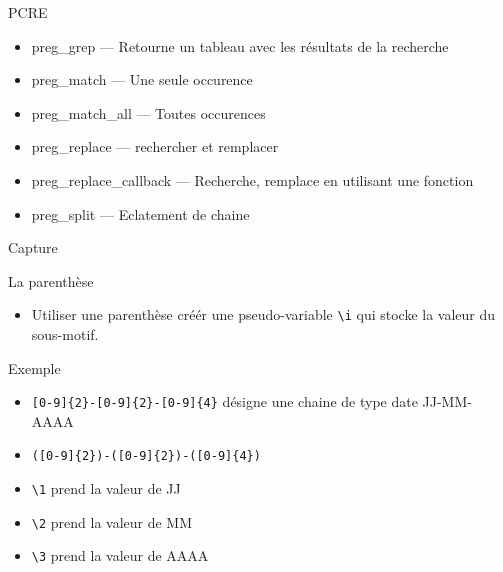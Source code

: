 \begin{frame}[containsverbatim]{\ftitle}
\def\blocktitle{PCRE}
\begin{block}{\blocktitle}
\begin{itemize}
\item preg\_grep — Retourne un tableau avec les résultats de la recherche
\item preg\_match — Une seule occurence
\item preg\_match\_all — Toutes occurences
\item preg\_replace — rechercher et remplacer
\item preg\_replace\_callback — Recherche, remplace en utilisant une fonction
\item preg\_split — Eclatement de chaine
\end{itemize}
\end{block}
\end{frame}

\def\ftitle{Capture}
\begin{frame}[containsverbatim]{\ftitle}
\def\blocktitle{La parenthèse}
\begin{block}{\blocktitle}
\begin{itemize}
\item Utiliser une parenthèse créér une pseudo-variable \verb!\i! qui stocke la valeur du sous-motif. %
\end{itemize}
\end{block}
\def\blocktitle{Exemple}
\begin{block}{\blocktitle}
\begin{itemize}
\item \verb![0-9]{2}-[0-9]{2}-[0-9]{4}! désigne une chaine de type date JJ-MM-AAAA
\item \verb!([0-9]{2})-([0-9]{2})-([0-9]{4})! 
\item \verb!\1! prend la valeur de JJ
\item \verb!\2! prend la valeur de MM
\item \verb!\3! prend la valeur de AAAA %
\end{itemize}
\end{block}
\end{frame}



